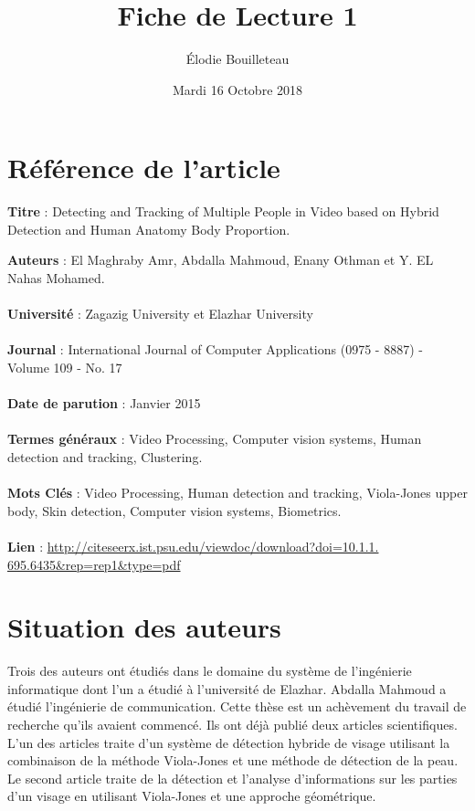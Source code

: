 \documentclass[11pt]{report}
\title{Fiche de Lecture 1}
\author{Élodie Bouilleteau}
\date{Mardi 16 Octobre 2018}
\begin{document}
\maketitle
\renewcommand{\thesection}{\arabic{section}} 

\section{Référence de l'article}
	\begin{flushleft}
		\textbf{Titre} : Detecting and Tracking of Multiple People in Video based on Hybrid Detection and Human Anatomy Body Proportion.
	\end{flushleft}
	\textbf{Auteurs} : El Maghraby Amr, Abdalla Mahmoud, Enany Othman et Y. EL
Nahas Mohamed.\\\\
	\textbf{Université} : Zagazig University et Elazhar University\\\\
	\textbf{Journal} : International Journal of Computer Applications (0975 - 8887)
- Volume 109 - No. 17\\\\
	\textbf{Date de parution} : Janvier 2015\\\\
	\textbf{Termes généraux} : Video Processing, Computer vision systems, Human detection and tracking, Clustering.\\\\
	\textbf{Mots Clés} : Video Processing, Human detection and tracking,  Viola-Jones upper body, Skin detection, Computer vision systems, Biometrics.\\\\
	\textbf{Lien} : \url{http://citeseerx.ist.psu.edu/viewdoc/download?doi=10.1.1.
695.6435&rep=rep1&type=pdf}
	
\section{Situation des auteurs}
Trois des auteurs ont étudiés dans le domaine du système de l’ingénierie informatique dont l’un a étudié à l’université de Elazhar. Abdalla Mahmoud a étudié l’ingénierie de communication. Cette thèse est un achèvement du travail de recherche qu’ils avaient commencé. Ils ont déjà publié deux articles scientifiques. L’un des articles traite d’un système de détection hybride de visage utilisant la combinaison de la méthode Viola-Jones et une méthode de détection de la peau. Le second article traite de la détection et l’analyse d’informations sur les parties d’un visage en utilisant Viola-Jones et une approche géométrique.
\end{document}
